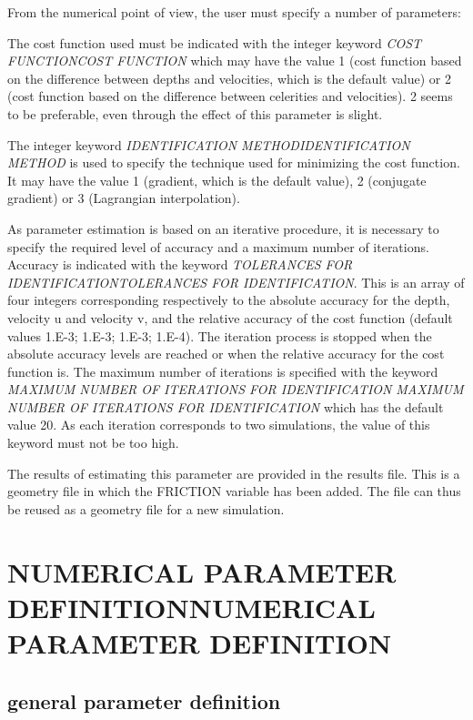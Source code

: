 \documentclass{article} %
\begin{document}
 From the numerical point of view, the user must specify a number of parameters:

 The cost function used must be indicated with the integer keyword \textit{COST FUNCTIONCOST FUNCTION} which may have the value 1 (cost function based on the difference between depths and velocities, which is the default value) or 2 (cost function based on the difference between celerities and velocities). 2 seems to be preferable, even through the effect of this parameter is slight.

 The integer keyword \textit{IDENTIFICATION METHODIDENTIFICATION  METHOD} is used to specify the technique used for minimizing the cost function. It may have the value 1 (gradient, which is the default value), 2 (conjugate gradient) or 3 (Lagrangian interpolation).

 As parameter estimation is based on an iterative procedure, it is necessary to specify the required level of accuracy and a maximum number of iterations. Accuracy is indicated with the keyword \textit{TOLERANCES FOR IDENTIFICATIONTOLERANCES FOR IDENTIFICATION}. This is an array of four integers corresponding respectively to the absolute accuracy for the depth, velocity u and velocity v, and the relative accuracy of the cost function (default values 1.E-3; 1.E-3; 1.E-3; 1.E-4). The iteration process is stopped when the absolute accuracy levels are reached or when the relative accuracy for the cost function is. The maximum number of iterations is specified with the keyword \textit{MAXIMUM NUMBER OF ITERATIONS FOR IDENTIFICATION} \textit{MAXIMUM NUMBER OF ITERATIONS FOR IDENTIFICATION} which has the default value 20. As each iteration corresponds to two simulations, the value of this keyword must not be too high.

 The results of estimating this parameter are provided in the results file. This is a geometry file in which the FRICTION variable has been added. The file can thus be reused as a geometry file for a new simulation.




\section{  NUMERICAL PARAMETER DEFINITIONNUMERICAL PARAMETER DEFINITION}


\subsection{ general parameter definition}
\end{document}
